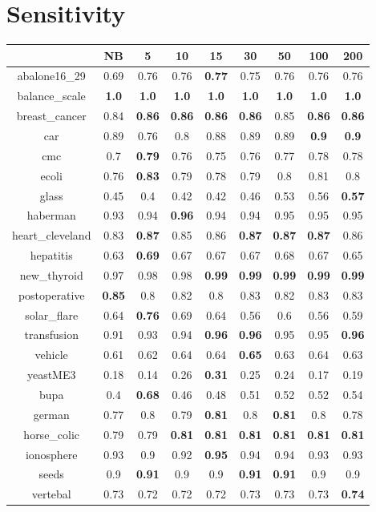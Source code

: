 \documentclass{article}%
\begin{document}
%
\section*{Sensitivity}%
\begin{tabular}{c|cccccccc}%
\hline%
&NB&5&10&15&30&50&100&200\\%
\hline%
abalone16\_29&0.69&0.76&0.76&\textbf{0.77}&0.75&0.76&0.76&0.76\\%
\hline%
balance\_scale&\textbf{1.0}&\textbf{1.0}&\textbf{1.0}&\textbf{1.0}&\textbf{1.0}&\textbf{1.0}&\textbf{1.0}&\textbf{1.0}\\%
\hline%
breast\_cancer&0.84&\textbf{0.86}&\textbf{0.86}&\textbf{0.86}&\textbf{0.86}&0.85&\textbf{0.86}&\textbf{0.86}\\%
\hline%
car&0.89&0.76&0.8&0.88&0.89&0.89&\textbf{0.9}&\textbf{0.9}\\%
\hline%
cmc&0.7&\textbf{0.79}&0.76&0.75&0.76&0.77&0.78&0.78\\%
\hline%
ecoli&0.76&\textbf{0.83}&0.79&0.78&0.79&0.8&0.81&0.8\\%
\hline%
glass&0.45&0.4&0.42&0.42&0.46&0.53&0.56&\textbf{0.57}\\%
\hline%
haberman&0.93&0.94&\textbf{0.96}&0.94&0.94&0.95&0.95&0.95\\%
\hline%
heart\_cleveland&0.83&\textbf{0.87}&0.85&0.86&\textbf{0.87}&\textbf{0.87}&\textbf{0.87}&0.86\\%
\hline%
hepatitis&0.63&\textbf{0.69}&0.67&0.67&0.67&0.68&0.67&0.65\\%
\hline%
new\_thyroid&0.97&0.98&0.98&\textbf{0.99}&\textbf{0.99}&\textbf{0.99}&\textbf{0.99}&\textbf{0.99}\\%
\hline%
postoperative&\textbf{0.85}&0.8&0.82&0.8&0.83&0.82&0.83&0.83\\%
\hline%
solar\_flare&0.64&\textbf{0.76}&0.69&0.64&0.56&0.6&0.56&0.59\\%
\hline%
transfusion&0.91&0.93&0.94&\textbf{0.96}&\textbf{0.96}&0.95&0.95&\textbf{0.96}\\%
\hline%
vehicle&0.61&0.62&0.64&0.64&\textbf{0.65}&0.63&0.64&0.63\\%
\hline%
yeastME3&0.18&0.14&0.26&\textbf{0.31}&0.25&0.24&0.17&0.19\\%
\hline%
bupa&0.4&\textbf{0.68}&0.46&0.48&0.51&0.52&0.52&0.54\\%
\hline%
german&0.77&0.8&0.79&\textbf{0.81}&0.8&\textbf{0.81}&0.8&0.78\\%
\hline%
horse\_colic&0.79&0.79&\textbf{0.81}&\textbf{0.81}&\textbf{0.81}&\textbf{0.81}&\textbf{0.81}&\textbf{0.81}\\%
\hline%
ionosphere&0.93&0.9&0.92&\textbf{0.95}&0.94&0.94&0.93&0.93\\%
\hline%
seeds&0.9&\textbf{0.91}&0.9&0.9&\textbf{0.91}&\textbf{0.91}&0.9&0.9\\%
\hline%
vertebal&0.73&0.72&0.72&0.72&0.73&0.73&0.73&\textbf{0.74}\\%
\hline%
\end{tabular}
\end{document}
